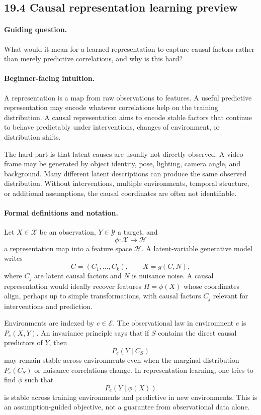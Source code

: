 \subsection{19.4 Causal representation learning preview}

\paragraph{Guiding question.}
What would it mean for a learned representation to capture causal factors rather than merely predictive correlations, and why is this hard?

\paragraph{Beginner-facing intuition.}
A representation is a map from raw observations to features. A useful predictive representation may encode whatever correlations help on the training distribution. A causal representation aims to encode stable factors that continue to behave predictably under interventions, changes of environment, or distribution shifts.

The hard part is that latent causes are usually not directly observed. A video frame may be generated by object identity, pose, lighting, camera angle, and background. Many different latent descriptions can produce the same observed distribution. Without interventions, multiple environments, temporal structure, or additional assumptions, the causal coordinates are often not identifiable.

\paragraph{Formal definitions and notation.}
Let \(X\in\mathcal X\) be an observation, \(Y\in\mathcal Y\) a target, and
\[
\phi:\mathcal X\to\mathcal H
\]
a representation map into a feature space \(\mathcal H\). A latent-variable generative model writes
\[
C=(C_1,\ldots,C_k),\qquad X=g(C,N),
\]
where \(C_j\) are latent causal factors and \(N\) is nuisance noise. A causal representation would ideally recover features \(H=\phi(X)\) whose coordinates align, perhaps up to simple transformations, with causal factors \(C_j\) relevant for interventions and prediction.

Environments are indexed by \(e\in\mathcal E\). The observational law in environment \(e\) is \(P_e(X,Y)\). An invariance principle says that if \(S\) contains the direct causal predictors of \(Y\), then
\[
P_e(Y\mid C_S)
\]
may remain stable across environments even when the marginal distribution \(P_e(C_S)\) or nuisance correlations change. In representation learning, one tries to find \(\phi\) such that
\[
P_e(Y\mid \phi(X))
\]
is stable across training environments and predictive in new environments. This is an assumption-guided objective, not a guarantee from observational data alone.

